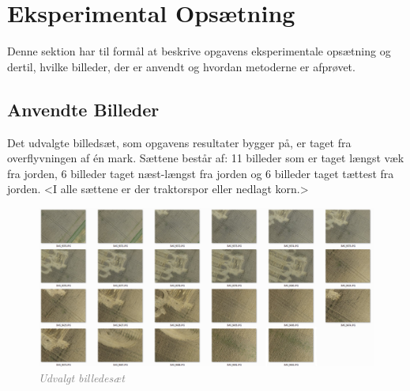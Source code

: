 \chapter{Eksperimental Opsætning}
Denne sektion har til formål at beskrive opgavens eksperimentale opsætning og dertil, hvilke billeder, der er anvendt og hvordan metoderne er afprøvet.
\section{Anvendte Billeder}
Det udvalgte billedsæt, som opgavens resultater bygger på, er taget fra overflyvningen af én mark. Sættene består af: 11 billeder som er taget længst væk fra jorden, 6 billeder taget næst-længst fra jorden og 6 billeder taget tættest fra jorden. <I alle sættene er der traktorspor eller nedlagt korn.>
\begin{figure}[H]
    \centering
    \includegraphics[width=1\textwidth]{fig/43a.png}
    \vspace{-0.5em}   
    \begin{center}
    \caption{\textcolor{gray}{\footnotesize \textit{Udvalgt billedesæt}}}
    \label{fig:lindblob}
     \end{center}
  \end{figure}
       \vspace{-2.7em}
\noindent
